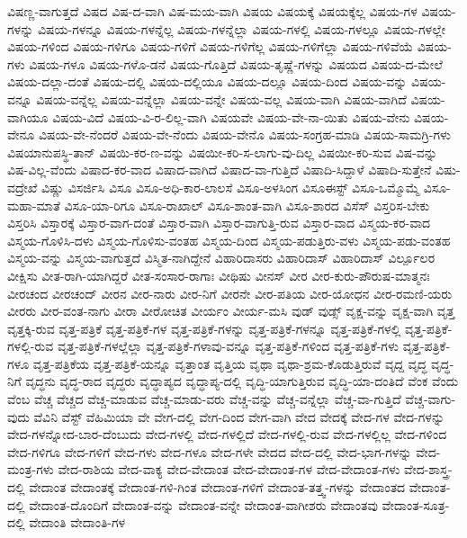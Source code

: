{ವಿಷಣ್ಣ-ವಾಗುತ್ತದೆ
ವಿಷದ
ವಿಷ-ದ-ವಾಗಿ
ವಿಷ-ಮಯ-ವಾಗಿ
ವಿಷಯ
ವಿಷಯಕ್ಕೆ
ವಿಷಯಕ್ಕೆಲ್ಲ
ವಿಷಯ-ಗಳ
ವಿಷಯ-ಗಳನ್ನು
ವಿಷಯ-ಗಳನ್ನೂ
ವಿಷಯ-ಗಳನ್ನೆಲ್ಲ
ವಿಷಯ-ಗಳನ್ನೆಲ್ಲಾ
ವಿಷಯ-ಗಳಲ್ಲಿ
ವಿಷಯ-ಗಳಲ್ಲೂ
ವಿಷಯ-ಗಳಲ್ಲೇ
ವಿಷಯ-ಗಳಿಂದ
ವಿಷಯ-ಗಳಿಗೂ
ವಿಷಯ-ಗಳಿಗೆ
ವಿಷಯ-ಗಳಿಗೆಲ್ಲ
ವಿಷಯ-ಗಳಿಗೆಲ್ಲಾ
ವಿಷಯ-ಗಳಿವೆಯೆ
ವಿಷಯ-ಗಳು
ವಿಷಯ-ಗಳೂ
ವಿಷಯ-ಗಳೊ-ಡನೆ
ವಿಷಯ-ಗೊತ್ತಿದೆ
ವಿಷಯ-ತೃಷ್ಣೆ-ಗಳನ್ನು
ವಿಷಯದ
ವಿಷಯ-ದ-ಮೇಲೆ
ವಿಷಯ-ದಲ್ಲಾ-ದಂತೆ
ವಿಷಯ-ದಲ್ಲಿ
ವಿಷಯ-ದಲ್ಲಿಯೂ
ವಿಷಯ-ದಲ್ಲೂ
ವಿಷಯ-ದಿಂದ
ವಿಷಯ-ವನ್ನು
ವಿಷಯ-ವನ್ನೂ
ವಿಷಯ-ವನ್ನೆಲ್ಲ
ವಿಷಯ-ವನ್ನೆಲ್ಲಾ
ವಿಷಯ-ವನ್ನೇ
ವಿಷಯ-ವಲ್ಲ
ವಿಷಯ-ವಾಗಿ
ವಿಷಯ-ವಾಗಿದೆ
ವಿಷಯ-ವಾಗಿಯೂ
ವಿಷಯ-ವಿದೆ
ವಿಷಯ-ವಿ-ರ-ಲಿಲ್ಲ-ವಾಗಿ
ವಿಷಯವೇ
ವಿಷಯ-ವೇ-ನಾ-ಯಿತು
ವಿಷಯ-ವೇನು
ವಿಷಯ-ವೇನೂ
ವಿಷಯ-ವೇ-ನೆಂದರೆ
ವಿಷಯ-ವೇ-ನೆಂದು
ವಿಷಯ-ವೇನೊ
ವಿಷಯ-ಸಂಗ್ರಹ-ಮಾಡಿ
ವಿಷಯ-ಸಾಮಗ್ರಿ-ಗಳು
ವಿಷಯಾನುಪಸ್ಥಿ-ತಾನ್
ವಿಷಯಿ-ಕರ-ಣ-ವನ್ನು
ವಿಷಯೀ-ಕರಿ-ಸ-ಲಾಗು-ವು-ದಿಲ್ಲ
ವಿಷಯೀ-ಕರಿ-ಸುವ
ವಿಷ-ವನ್ನು
ವಿಷ-ವಿಲ್ಲ-ವೆಂದು
ವಿಷಾದ-ಕರ-ವಾದ
ವಿಷಾದ-ವಾಗಿದೆ
ವಿಷಾದ-ವಾ-ಗುತ್ತಿದೆ
ವಿಷಾದಿ-ಸಿದ್ದಾಳೆ
ವಿಷಾದಿ-ಸುತ್ತೇನೆ
ವಿಷು-ವದ್ರೇಖೆ
ವಿಷ್ಣು
ವಿಸರ್ಜಿಸಿ
ವಿಸೂ
ವಿಸೂ-ಅಧಿ-ಕಾರ-ಲಾಲಸೆ
ವಿಸೂ-ಅಳಸಿಂಗ
ವಿಸೂಈಸ್ಟ್
ವಿಸೂ-ಒಮ್ಮೊಮ್ಮೆ
ವಿಸೂ-ಮಹಾ-ಮಾತೆ
ವಿಸೂ-ಯಾ-ರಿಗೂ
ವಿಸೂ-ರಾಖಾಲ್
ವಿಸೂ-ಶಾಂತ-ವಾಗಿ
ವಿಸೂ-ಶಾರದ
ವಿಸೆಸ್
ವಿಸ್ತರಿಸ-ಬೇಕು
ವಿಸ್ತರಿಸಿ
ವಿಸ್ತಾರಕ್ಕೆ
ವಿಸ್ತಾರ-ವಾಗ-ದಂತೆ
ವಿಸ್ತಾರ-ವಾಗಿ
ವಿಸ್ತಾರ-ವಾಗುತ್ತಿ-ರುವ
ವಿಸ್ತಾರ-ವಾದ
ವಿಸ್ಮಯ-ಕರ-ವಾದ
ವಿಸ್ಮಯ-ಗೊಳಿಸಿ-ದಳು
ವಿಸ್ಮಯ-ಗೊಳಿಸು-ವಂತಹ
ವಿಸ್ಮಯ-ದಿಂದ
ವಿಸ್ಮಯ-ಪಡುತ್ತಿರು-ವಳು
ವಿಸ್ಮಯ-ಪಡು-ವಂತಹ
ವಿಸ್ಮಯ-ವನ್ನು
ವಿಸ್ಮಯ-ವಾಗುತ್ತದೆ
ವಿಸ್ಮಿತ-ನಾಗಿದ್ದೇನೆ
ವಿಹಾರಿದಾಸರು
ವಿಹಾರಿದಾಸ್
ವಿಹಾರಿದಾಸ್‌
ವಿ‌ರ್ಲ್ಪೂಲರ
ವೀಕ್ಷಿಸು
ವೀತ-ರಾಗಿ-ಯಾಗಿದ್ದರೆ
ವೀತ-ಸಂಸಾರ-ರಾಗಾಃ
ವೀಥಿಷು
ವೀನಸ್‌
ವೀರ
ವೀರ-ಕುರು-ಪೌರುಷ-ಮಾತ್ಮನಃ
ವೀರಚಂದ
ವೀರಚಂದ್
ವೀರನ
ವೀರ-ನಾರು
ವೀರ-ನಿಗೆ
ವೀರನೇ
ವೀರ-ಪತಿಯ
ವೀರ-ಯೋಧನ
ವೀರ-ರಮಣಿ-ಯರು
ವೀರರು
ವೀರ-ವಂತ-ನಾಗು
ವೀರಾ
ವೀರೋಚಿತ
ವೀರ್ಯಂ
ವೀರ್ಯ-ಮಸಿ
ವುಡ್
ವುಡ್ಸ್
ವೃಕ್ಷ-ವನ್ನು
ವೃಕ್ಷ-ವಾಗಿ
ವೃತ್ತ
ವೃತ್ತಕ್ಕಿ-ರುವ
ವೃತ್ತ-ಪತ್ರಿಕೆ
ವೃತ್ತ-ಪತ್ರಿಕೆ-ಗಳ
ವೃತ್ತ-ಪತ್ರಿಕೆ-ಗಳನ್ನು
ವೃತ್ತ-ಪತ್ರಿಕೆ-ಗಳನ್ನೂ
ವೃತ್ತ-ಪತ್ರಿಕೆ-ಗಳಲ್ಲಿ
ವೃತ್ತ-ಪತ್ರಿಕೆ-ಗಳಲ್ಲಿ-ರುವ
ವೃತ್ತ-ಪತ್ರಿಕೆ-ಗಳಲ್ಲೆಲ್ಲಾ
ವೃತ್ತ-ಪತ್ರಿಕೆ-ಗಳಾವು-ವನ್ನೂ
ವೃತ್ತ-ಪತ್ರಿಕೆ-ಗಳಿಂದ
ವೃತ್ತ-ಪತ್ರಿಕೆ-ಗಳು
ವೃತ್ತ-ಪತ್ರಿಕೆ-ಗಳೂ
ವೃತ್ತ-ಪತ್ರಿಕೆಯ
ವೃತ್ತ-ಪತ್ರಿಕೆ-ಯನ್ನೂ
ವೃತ್ತಾಂತ
ವೃತ್ತಿಯ
ವೃಥಾ
ವೃಥಾ-ಶ್ರಮ-ಕೊಡುತ್ತಿರುವೆ
ವೃದ್ದ
ವೃದ್ಧ
ವೃದ್ಧ-ನಿಗೆ
ವೃದ್ಧನು
ವೃದ್ಧ-ರಾದ
ವೃದ್ಧರು
ವೃದ್ಧಾಪ್ಯದ
ವೃದ್ಧಾಪ್ಯ-ದಲ್ಲಿ
ವೃದ್ಧಿ-ಯಾಗುತ್ತಿರುವ
ವೃದ್ಧಿ-ಯಾ-ದಂತಿದೆ
ವೆಂಕ
ವೆಂದು
ವೆಂಬ
ವೆಚ್ಚ
ವೆಚ್ಚದ
ವೆಚ್ಚ-ಮಾಡುವ
ವೆಚ್ಚ-ಮಾಡು-ವರು
ವೆಚ್ಚ-ವನ್ನು
ವೆಚ್ಚ-ವನ್ನೆಲ್ಲಾ
ವೆಚ್ಚ-ವಾ-ಗುತ್ತಿದೆ
ವೆಚ್ಚ-ವಾಗು-ವುದು
ವೆವಿನಿ
ವೆಸ್ಟ್
ವೆಹಿಮಿಯಾ
ವೇ
ವೇಗ-ದಲ್ಲಿ
ವೇಗ-ದಿಂದ
ವೇಗ-ವಾಗಿ
ವೇದ
ವೇದಕ್ಕೆ
ವೇದ-ಗಳ
ವೇದ-ಗಳನ್ನು
ವೇದ-ಗಳನ್ನೋದ-ಬಾರ-ದೆಂಬುದು
ವೇದ-ಗಳಲ್ಲಿ
ವೇದ-ಗಳಲ್ಲಿದೆ
ವೇದ-ಗಳಲ್ಲಿ-ರುವ
ವೇದ-ಗಳಲ್ಲಿಲ್ಲ
ವೇದ-ಗಳಿಂದ
ವೇದ-ಗಳಿಗೂ
ವೇದ-ಗಳಿಗೆ
ವೇದ-ಗಳು
ವೇದ-ಗಳೂ
ವೇದ-ಗಳೇ
ವೇದದ
ವೇದ-ದಲ್ಲಿ
ವೇದ-ಭಾಗ-ಗಳನ್ನು
ವೇದ-ಮಂತ್ರ-ಗಳು
ವೇದ-ರಾಶಿಯ
ವೇದ-ವಾಕ್ಯ
ವೇದ-ವೇದಾಂತ
ವೇದ-ವೇದಾಂತ-ಗಳ
ವೇದ-ವೇದಾಂತ-ಗಳು
ವೇದ-ಶಾಸ್ತ್ರ-ದಲ್ಲಿ
ವೇದಾಂತ
ವೇದಾಂತಕ್ಕೆ
ವೇದಾಂತ-ಗಳಿ-ಗಿಂತ
ವೇದಾಂತ-ಗಳಿಗೆ
ವೇದಾಂತ-ತತ್ತ್ವ-ಗಳನ್ನು
ವೇದಾಂತದ
ವೇದಾಂತ-ದಲ್ಲಿ
ವೇದಾಂತ-ದೊಂದಿಗೆ
ವೇದಾಂತ-ವನ್ನು
ವೇದಾಂತ-ವನ್ನೇ
ವೇದಾಂತ-ವಾಗೀಶರು
ವೇದಾಂತವು
ವೇದಾಂತ-ಸೂತ್ರ-ದಲ್ಲಿ
ವೇದಾಂತಿ
ವೇದಾಂತಿ-ಗಳ
}
